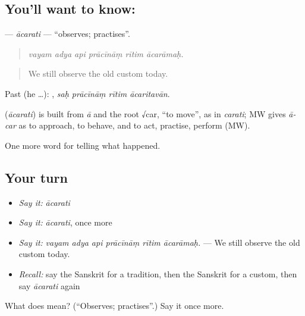 \subsection*{You'll want to know: }
\textbf{} — \emph{ācarati} — \textquotedblleft{}observes; practises\textquotedblright{}.

\begin{quote}
     
\end{quote}

\begin{quote}
\emph{vayam adya api prācīnāṃ rītim ācarāmaḥ.}
\end{quote}

\begin{quote}
We still observe the old custom today.
\end{quote}

Past (he …):    , \emph{saḥ prācīnāṃ rītim ācaritavān}.

\begin{cousinweb}
\textbf{} (\emph{ācarati}) is built from \emph{ā} and the root √car, \textquotedblleft{}to move\textquotedblright{}, as in \emph{carati}; MW gives \emph{ā-car} as to approach, to behave, and to act, practise, perform (MW).
\end{cousinweb}

\begin{grammarlens}[title={What you've built}]
One more word for telling what happened.
\end{grammarlens}

\subsection*{Your turn}
\begin{itemize}
\raggedright
  \item \emph{Say it:} \emph{ācarati}
  \item \emph{Say it:} \emph{ācarati}, once more
  \item \emph{Say it:} \emph{vayam adya api prācīnāṃ rītim ācarāmaḥ.} — We still observe the old custom today.
  \item \emph{Recall:} say the Sanskrit for a tradition, then the Sanskrit for a custom, then say \emph{ācarati} again
\end{itemize}

\begin{tcolorbox}[breakable,colback=teal!4,colframe=teal!35!black,title={Before you move on}]
What does  mean? (\textquotedblleft{}Observes; practises\textquotedblright{}.) Say it once more.
\end{tcolorbox}
